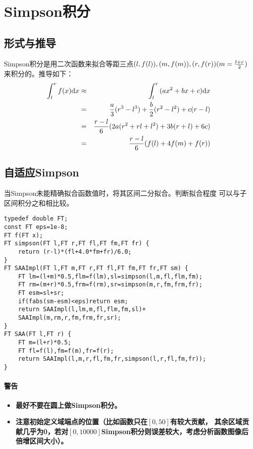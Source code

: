 \section{Simpson积分}
\subsection{形式与推导}
Simpson积分是用二次函数来拟合等距三点$(l,f(l)),(m,f(m)),(r,f(r))\\
(m=\frac{l+r}{2})$来积分的。推导如下：
\begin{eqnarray*}
    \int_l^r{f(x)\mathrm{d} x}&\approx&\int_l^r{(ax^2+bx+c)\mathrm{d} x}\\
    &=&\frac{a}{3}(r^3-l^3)+\frac{b}{2}(r^2-l^2)+c(r-l)\\
    &=&\frac{r-l}{6}(2a(r^2+rl+l^2)+3b(r+l)+6c)\\
    &=&\frac{r-l}{6}(f(l)+4f(m)+f(r))
\end{eqnarray*}

\subsection{自适应Simpson}
当Simpson未能精确拟合函数值时，将其区间二分拟合。判断拟合程度
可以与子区间积分之和相比较。

\begin{lstlisting}
typedef double FT;
const FT eps=1e-8;
FT f(FT x);
FT simpson(FT l,FT r,FT fl,FT fm,FT fr) {
    return (r-l)*(fl+4.0*fm+fr)/6.0;
}
FT SAAImpl(FT l,FT m,FT r,FT fl,FT fm,FT fr,FT sm) {
    FT lm=(l+m)*0.5,flm=f(lm),sl=simpson(l,m,fl,flm,fm);
    FT rm=(m+r)*0.5,frm=f(rm),sr=simpson(m,r,fm,frm,fr);
    FT esm=sl+sr;
    if(fabs(sm-esm)<eps)return esm;
    return SAAImpl(l,lm,m,fl,flm,fm,sl)+
    SAAImpl(m,rm,r,fm,frm,fr,sr);
}
FT SAA(FT l,FT r) {
    FT m=(l+r)*0.5;
    FT fl=f(l),fm=f(m),fr=f(r);
    return SAAImpl(l,m,r,fl,fm,fr,simpson(l,r,fl,fm,fr));
}
\end{lstlisting}

\paragraph{警告}
\begin{itemize}
    \item {\bfseries 最好不要在圆上做Simpson积分。}
    \item {\bfseries 注意初始定义域端点的位置（比如函数只在$[0,50]$有较大贡献，
其余区域贡献几乎为0，若对$[0,10000]$Simpson积分则误差较大，考虑分析函数图像后
倍增区间大小）。}
\end{itemize}
